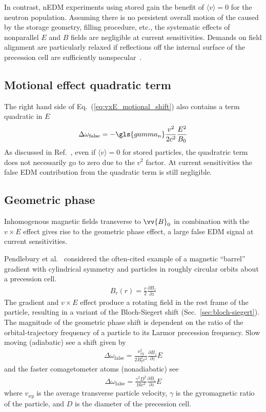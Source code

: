 In contrast, nEDM experiments using stored \ucn gain the benefit of $\langle v \rangle =0$ for the neutron population. Assuming there is no persistent overall motion of the \ucn caused by the storage geometry, filling procedure, etc., the systematic effects of nonparallel $E$ and $B$ fields are negligible at current sensitivities. Demands on field alignment are particularly relaxed if \ucn reflections off the internal surface of the precession cell are sufficiently nonspecular~\cite{pendlebury_revised_2015}.

\subsection*{Motional effect quadratic term}

The right hand side of Eq.~(\ref{eq:vxE_motional_shift}) also contains a term quadratic in $E$
%
\begin{gather}
    \Delta\omega_\text{false} = -\gls{gamma_n} \frac{v^2}{2c^2}\frac{E^2}{B_0} 
\end{gather}
%
As discussed in Ref.~\cite{lamoreaux_experimental_2009}, even if $\langle v \rangle=0$ for stored particles, the quadratric term does not necessarily go to zero due to the $v^2$ factor. At current sensitivities the false EDM contribution from the quadratic term is still negligible.

\subsection*{Geometric phase}

Inhomogenous magnetic fields transverse to $\vv{B}_0$ in combination with the $v\times E$ effect gives rise to the geometric phase effect, a large false EDM signal at current sensitivities. 

Pendlebury et al.~\cite{pendlebury_geometric-phase-induced_2004} considered the often-cited example of a  magnetic ``barrel'' gradient with cylindrical symmetry and particles in roughly circular orbits about a precession cell.
%
\begin{gather}
    B_r(r)=\frac{r}{2}\frac{\partial B_z}{\partial z}
\end{gather}
%
The gradient and $v\times E$ effect produce a rotating field in the rest frame of the particle, resulting in a variant of the Bloch-Siegert shift (Sec.~\ref{sec:bloch-siegert}). The magnitude of the geometric phase shift is dependent on the ratio of the orbital-trajectory frequency of a particle to its Larmor precession frequency. Slow moving \ucn (adiabatic) see a shift given by~\cite{pendlebury_geometric-phase-induced_2004, afach_measurement_2015}
%
\begin{gather}
    \Delta\omega_\text{false} = \frac{v^2_{xy}}{2 B_0^2 c^2}\frac{\partial B_z}{\partial z}E
\end{gather}
%
and the faster \hg comagetometer atoms (nonadiabatic) see
%
\begin{gather}
    \Delta\omega_\text{false} = \frac{\gamma^2 D^2}{16  c^2}\frac{\partial B_z}{\partial z}E
\end{gather}
%
where $v_{xy}$ is the average transverse particle velocity, $\gamma$ is the gyromagnetic ratio of the particle, and $D$ is the diameter of the precession cell. 


